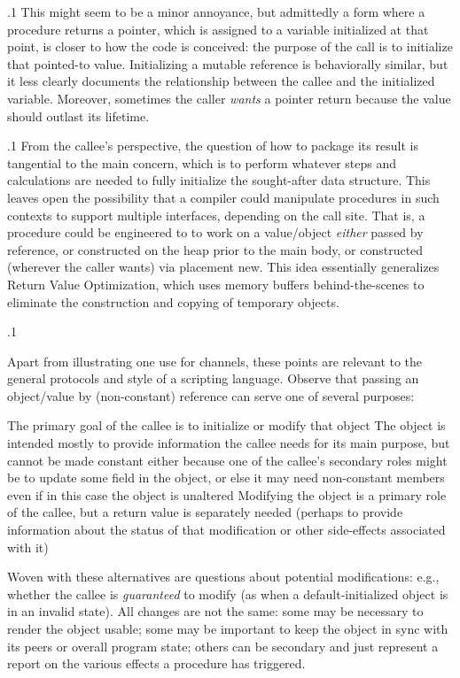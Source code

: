 \documentclass[11pt, twocolumn]{article}
\begin{document}
\p.1{%
This might seem to be a minor annoyance, but admittedly
a form where a procedure returns a pointer, which is
assigned to a variable initialized at that point,
is closer to how the code is conceived: the
purpose of the call is to initialize that pointed-to value.
Initializing a mutable reference is behaviorally
similar, but it less clearly documents the relationship
between the callee and the initialized variable.
Moreover, sometimes the caller \textit{wants} a
pointer return because the value should outlast
its lifetime.
}%

\p.1{%
From the callee's perspective, the question of how to
package its result is tangential to the main
concern, which is to perform whatever
steps and calculations are needed to fully initialize
the sought-after data structure. This leaves open
the possibility that a compiler could manipulate
procedures in such contexts to support multiple
interfaces, depending on the call site. That
is, a procedure could be engineered to
to work on a value/object \textit{either} passed
by reference, or constructed on the heap prior
to the main body, or constructed (wherever the
caller wants) via placement new. This idea
essentially generalizes Return Value Optimization,
which uses memory buffers behind-the-scenes
to eliminate the construction and copying
of temporary objects.
}%

\p.1{%
Apart from illustrating one use for channels, these
points are relevant to the general protocols
and style of a scripting language. Observe
that passing an object/value by (non-constant) reference
can serve one of several purposes:\upAdj{7pt}

\begin{docEnumerate}

\enumsItem{}   The primary goal of the callee is to initialize or modify
that object
\enumsItem{}   The object is intended mostly to provide information the callee
needs for its main purpose, but cannot be made constant
either because one of the callee's secondary roles
might be to update some field in the object, or else
it may need non-constant members even
if in this case the object is unaltered
\enumsItem{}   Modifying the object is a primary role of the callee,
but a return value is separately needed (perhaps to
provide information about the status of that modification
or other side-effects associated with it)
\end{docEnumerate}

\nip{}%
Woven with these alternatives are questions about
potential modifications: e.g., whether the callee
is \textit{guaranteed} to modify (as when a default-initialized
object is in an invalid state). All changes
are not the same: some may be necessary to render the
object usable; some may be important to keep the
object in sync with its peers or overall program state;
others can be secondary and just represent a
report on the various effects a procedure has triggered.
}%
\end{document}
